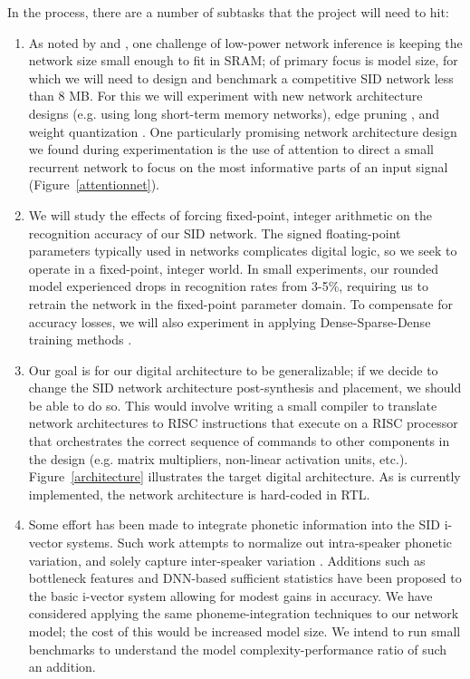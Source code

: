 \documentclass[journal,12pt,onecolumn,draftclsnofoot,]{sty/IEEEtran}
\begin{document}
In the process, there are a number of subtasks that the project will need to hit:
\begin{enumerate}
\item As noted by \cite{price_dnn} and \cite{deepcompression}, one challenge of low-power network inference is keeping the network size small enough to fit in SRAM; of primary focus is model size, for which we will need to design and benchmark a competitive SID network less than 8 MB. For this we will experiment with new network architecture designs (e.g. using long short-term memory networks), edge pruning \cite{deepcompression}, and weight quantization \cite{quantize}. One particularly promising network architecture design we found during experimentation is the use of attention to direct a small recurrent network to focus on the most informative parts of an input signal \cite{attention} (Figure~\ref{attentionnet}).

\item We will study the effects of forcing fixed-point, integer arithmetic on the recognition accuracy of our SID network. The signed floating-point parameters typically used in networks complicates digital logic, so we seek to operate in a fixed-point, integer world. In small experiments, our rounded model experienced drops in recognition rates from 3-5\%, requiring us to retrain the network in the fixed-point parameter domain. To compensate for accuracy losses, we will also experiment in applying Dense-Sparse-Dense training methods \cite{dsd}.

\item Our goal is for our digital architecture to be generalizable; if we decide to change the SID network architecture post-synthesis and placement, we should be able to do so. This would involve writing a small compiler to translate network architectures to RISC instructions that execute on a RISC processor that orchestrates the correct sequence of commands to other components in the design (e.g. matrix multipliers, non-linear activation units, etc.). Figure~\ref{architecture} illustrates the target digital architecture. As is currently implemented, the network architecture is hard-coded in RTL.

\item Some effort has been made to integrate phonetic information into the SID i-vector systems. Such work attempts to normalize out intra-speaker phonetic variation, and solely capture inter-speaker variation \cite{lidsid, multitaskasr}. Additions such as bottleneck features and DNN-based sufficient statistics have been proposed to the basic i-vector system allowing for modest gains in accuracy. We have considered applying the same phoneme-integration techniques to our network model; the cost of this would be increased model size. We intend to run small benchmarks to understand the model complexity-performance ratio of such an addition.


\end{enumerate}
\end{document}

